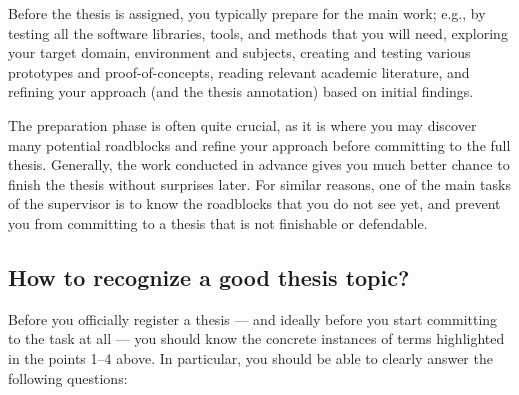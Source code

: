Before the thesis is assigned, you typically prepare for the main work; e.g., by testing all the software libraries, tools, and methods that you will need, exploring your target domain, environment and subjects, creating and testing various prototypes and proof-of-concepts, reading relevant academic literature, and refining your approach (and the thesis annotation) based on initial findings.

The preparation phase is often quite crucial, as it is where you may discover many potential roadblocks and refine your approach before committing to the full thesis. Generally, the work conducted in advance gives you much better chance to finish the thesis without surprises later. For similar reasons, one of the main tasks of the supervisor is to know the roadblocks that you do not see yet, and prevent you from committing to a thesis that is not finishable or defendable.

\subsection{How to recognize a good thesis topic?}

Before you officially register a thesis --- and ideally before you start committing to the task at all --- you should know the concrete instances of terms highlighted in the points 1--4 above. In particular, you should be able to clearly answer the following questions:

